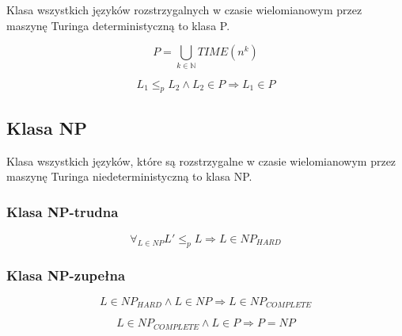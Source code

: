 \documentclass{../notatki}
\begin{document}
Klasa wszystkich języków rozstrzygalnych w czasie wielomianowym przez maszynę
Turinga deterministyczną to klasa P.

$$
P = \bigcup_{k \in \mathbb{N}} TIME(n^k)
$$

$$
L_1 \le_p L_2 \land L_2 \in P \Rightarrow L_1 \in P
$$

\subsection{Klasa NP}

Klasa wszystkich języków, które są rozstrzygalne w czasie wielomianowym przez
maszynę Turinga niedeterministyczną to klasa NP.

\subsubsection{Klasa NP-trudna}

$$
\forall_{L \in NP} L' \le_p L \Rightarrow L \in NP_{HARD}
$$

\subsubsection{Klasa NP-zupełna}

$$
L \in NP_{HARD} \land L \in NP \Rightarrow L \in NP_{COMPLETE}
$$

$$
L \in NP_{COMPLETE} \land L \in P \Rightarrow P = NP
$$
\end{document}
